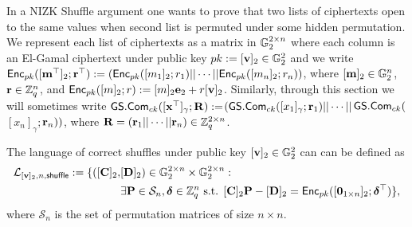 In a NIZK Shuffle argument one wants to prove that two lists of ciphertexts open to the same values when second list is permuted under some hidden permutation.
We represent each list of ciphertexts as a matrix in $\mathbb{G}_2^{2\times n}$ where each column is an El-Gamal ciphertext under public key $pk:=[\mathbf{v}]_2\in\mathbb{G}^2_2$ and we write $\mathsf{Enc}_{pk}([\mathbf{m}^\top]_2;\mathbf{r}^\top):=(\mathsf{Enc}_{pk}([m_1]_2;r_1)||\cdots||\mathsf{Enc}_{pk}([m_n]_2;r_n))$, where $[\mathbf{m}]_2\in\mathbb{G}_2^n$, $\mathbf{r}\in\mathbb{Z}_q^n$, and $\mathsf{Enc}_{pk}([m]_2;r):=[m]_2\mathbf{e}_2+r[\mathbf{v}]_2$. Similarly, through this section we will sometimes write ${\mathsf{GS}}.\mathsf{Com}_{ck}([\mathbf{x}^\top]_\gamma;\mathbf{{R}}):=$\-$({\mathsf{GS}}.\mathsf{Com}_{ck}([x_1]_\gamma;\mathbf{r}_1)||\cdots||$${\mathsf{GS}}.\mathsf{Com}_{ck}($$[x_n]_\gamma;$$\mathbf{r}_n))$, where $\mathbf{{R}}=(\mathbf{r}_1||\cdots||\mathbf{r}_n)\in\mathbb{Z}_q^{2\times n}$.

The language of correct shuffles under public key $[\mathbf{v}]_2\in\mathbb{G}^2_2$ can can be defined as 
\begin{align*}
\mathcal{L}_{[\mathbf{v}]_2,n,\mathsf{shuffle}}:=\{([\mathbf{{C}}]_2,&[\mathbf{{D}}]_2)\in\mathbb{G}_2^{2\times n}\times \mathbb{G}_2^{2\times n} :\\
                                                         &\exists \mathbf{{P}}\in\mathcal{S}_n,{\boldsymbol \delta}\in\mathbb{Z}_q^n \text{ s.t. } {[\mathbf{{C}}]_2\mathbf{{P}}-[\mathbf{{D}}]_2 = \mathsf{Enc}_{pk}([\mathbf{0}_{1\times n}]_2;{\boldsymbol \delta}^\top)}\},
\end{align*}
where $\mathcal{S}_n$ is the set of permutation matrices of size $n\times n$. %

 
